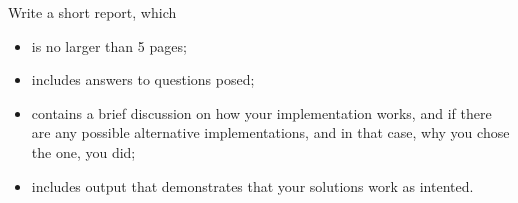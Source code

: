 Write a short report, which 
\begin{itemize}
\item is no larger than 5 pages;
\item includes answers to questions posed;
\item contains a brief discussion on how your implementation works,
  and if there are any possible alternative implementations, and in that
  case, why you chose the one, you did;
\item includes output that demonstrates that your solutions work as intented.
\end{itemize}
